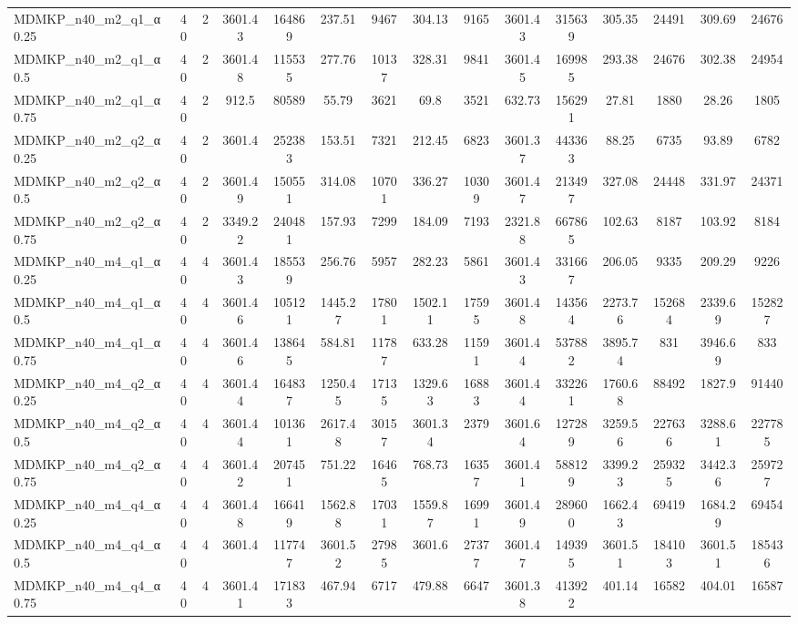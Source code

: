 \begin{table}[!ht]
{\begin{tabular}{lcccccccccccccc}
MDMKP\_n40\_m2\_q1\_α0.25 & 40 & 2 & 3601.43 & 164869 & 237.51 & 9467 & 304.13 & 9165 & 3601.43 & 315639 & 305.35 & 24491 & 309.69 & 24676 \\
MDMKP\_n40\_m2\_q1\_α0.5 & 40 & 2 & 3601.48 & 115535 & 277.76 & 10137 & 328.31 & 9841 & 3601.45 & 169985 & 293.38 & 24676 & 302.38 & 24954 \\
MDMKP\_n40\_m2\_q1\_α0.75 & 40 & 2 & 912.5 & 80589 & 55.79 & 3621 & 69.8 & 3521 & 632.73 & 156291 & 27.81 & 1880 & 28.26 & 1805 \\
MDMKP\_n40\_m2\_q2\_α0.25 & 40 & 2 & 3601.4 & 252383 & 153.51 & 7321 & 212.45 & 6823 & 3601.37 & 443363 & 88.25 & 6735 & 93.89 & 6782 \\
MDMKP\_n40\_m2\_q2\_α0.5 & 40 & 2 & 3601.49 & 150551 & 314.08 & 10701 & 336.27 & 10309 & 3601.47 & 213497 & 327.08 & 24448 & 331.97 & 24371 \\
MDMKP\_n40\_m2\_q2\_α0.75 & 40 & 2 & 3349.22 & 240481 & 157.93 & 7299 & 184.09 & 7193 & 2321.88 & 667865 & 102.63 & 8187 & 103.92 & 8184 \\
MDMKP\_n40\_m4\_q1\_α0.25 & 40 & 4 & 3601.43 & 185539 & 256.76 & 5957 & 282.23 & 5861 & 3601.43 & 331667 & 206.05 & 9335 & 209.29 & 9226 \\
MDMKP\_n40\_m4\_q1\_α0.5 & 40 & 4 & 3601.46 & 105121 & 1445.27 & 17801 & 1502.11 & 17595 & 3601.48 & 143564 & 2273.76 & 152684 & 2339.69 & 152827 \\
MDMKP\_n40\_m4\_q1\_α0.75 & 40 & 4 & 3601.46 & 138645 & 584.81 & 11787 & 633.28 & 11591 & 3601.44 & 537882 & 3895.74 & 831 & 3946.69 & 833 \\
MDMKP\_n40\_m4\_q2\_α0.25 & 40 & 4 & 3601.44 & 164837 & 1250.45 & 17135 & 1329.63 & 16883 & 3601.44 & 332261 & 1760.68 & 88492 & 1827.9 & 91440 \\
MDMKP\_n40\_m4\_q2\_α0.5 & 40 & 4 & 3601.44 & 101361 & 2617.48 & 30157 & 3601.34 & 2379 & 3601.64 & 127289 & 3259.56 & 227636 & 3288.61 & 227785 \\
MDMKP\_n40\_m4\_q2\_α0.75 & 40 & 4 & 3601.42 & 207451 & 751.22 & 16465 & 768.73 & 16357 & 3601.41 & 588129 & 3399.23 & 259325 & 3442.36 & 259727 \\
MDMKP\_n40\_m4\_q4\_α0.25 & 40 & 4 & 3601.48 & 166419 & 1562.88 & 17031 & 1559.87 & 16991 & 3601.49 & 289600 & 1662.43 & 69419 & 1684.29 & 69454 \\
MDMKP\_n40\_m4\_q4\_α0.5 & 40 & 4 & 3601.4 & 117747 & 3601.52 & 27985 & 3601.6 & 27377 & 3601.47 & 149395 & 3601.51 & 184103 & 3601.51 & 185436 \\
MDMKP\_n40\_m4\_q4\_α0.75 & 40 & 4 & 3601.41 & 171833 & 467.94 & 6717 & 479.88 & 6647 & 3601.38 & 413922 & 401.14 & 16582 & 404.01 & 16587 \\

\end{tabular}}
\end{table}
